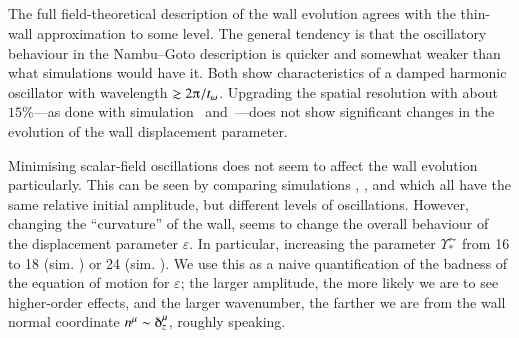 






    \subsection{}
        The full field-theoretical description of the wall evolution agrees with the thin-wall approximation to some level. The general tendency is that the oscillatory behaviour in the Nambu--Goto description is quicker and somewhat weaker than what simulations would have it. Both show characteristics of a damped harmonic oscillator with wavelength $\gtrsim 2\ppi / t_\omega$. Upgrading the spatial resolution with about $15\%$---as done with simulation~ and~---does not show significant changes in the evolution of the wall displacement parameter.
        
        Minimising scalar-field oscillations does not seem to affect the wall evolution particularly. This can be seen by comparing simulations , ,  and  which all have the same relative initial amplitude, but different levels of oscillations. However, changing the ``curvature'' of the wall, seems to change the overall behaviour of the displacement parameter $\varepsilon$. In particular, increasing the parameter $\Upsilon^{\AC}_\ast$ from 16 to 18 (sim. ) or 24 (sim. ). We use this as a naive quantification of the badness of the equation of motion for $\varepsilon$; the larger amplitude, the more likely we are to see higher-order effects, and the larger wavenumber, the farther we are from the wall normal coordinate $n\^\mu \sim \deltaup\indices*{^\mu _z}$, roughly speaking. %

